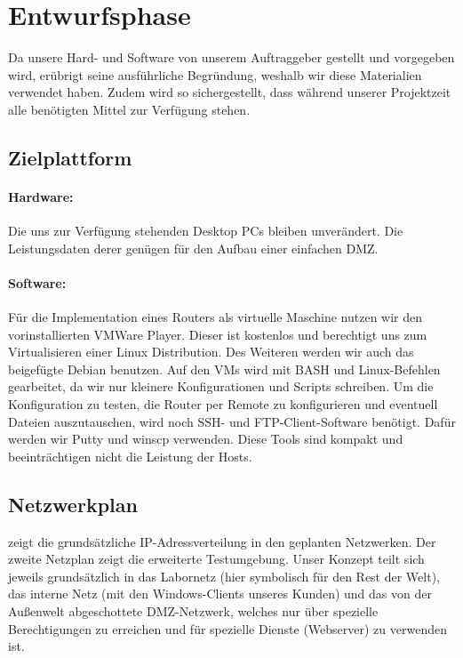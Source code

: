 \section{Entwurfsphase} 
\label{sec:Entwurfsphase}

Da unsere Hard- und Software von unserem Auftraggeber gestellt und vorgegeben wird, erübrigt seine ausführliche Begründung, weshalb wir diese Materialien verwendet haben. Zudem wird so sichergestellt, dass während unserer Projektzeit alle benötigten Mittel zur Verfügung stehen.

\subsection{Zielplattform}
\label{sec:Zielplattform}

\paragraph*{Hardware: } 
Die uns zur Verfügung stehenden Desktop PCs bleiben unverändert. Die Leistungsdaten derer  genügen für den Aufbau einer einfachen DMZ.

\paragraph*{Software: } 
Für die Implementation eines Routers als virtuelle Maschine nutzen wir den vorinstallierten VMWare Player. Dieser ist kostenlos und berechtigt uns zum Virtualisieren einer Linux Distribution. Des Weiteren werden wir auch das beigefügte Debian benutzen. Auf den VMs wird mit BASH und Linux-Befehlen gearbeitet, da wir nur kleinere Konfigurationen und Scripts schreiben. Um die Konfiguration zu testen, die Router per Remote zu konfigurieren und eventuell Dateien auszutauschen, wird noch SSH- und FTP-Client-Software benötigt. Dafür werden wir Putty und winscp verwenden. Diese Tools sind kompakt und beeinträchtigen nicht die Leistung der Hosts.

\subsection{Netzwerkplan}
\label{sec:Geschaeftslogik}

 zeigt die grundsätzliche IP-Adressverteilung in den geplanten Netzwerken.
Der zweite Netzplan zeigt die erweiterte Testumgebung. 
Unser Konzept teilt sich jeweils grundsätzlich in das Labornetz (hier symbolisch für den Rest der Welt), das interne Netz (mit den Windows-Clients unseres Kunden) und das von der Außenwelt abgeschottete \ac{DMZ}-Netzwerk, welches nur über spezielle Berechtigungen zu erreichen und für spezielle Dienste (Webserver) zu verwenden ist.

